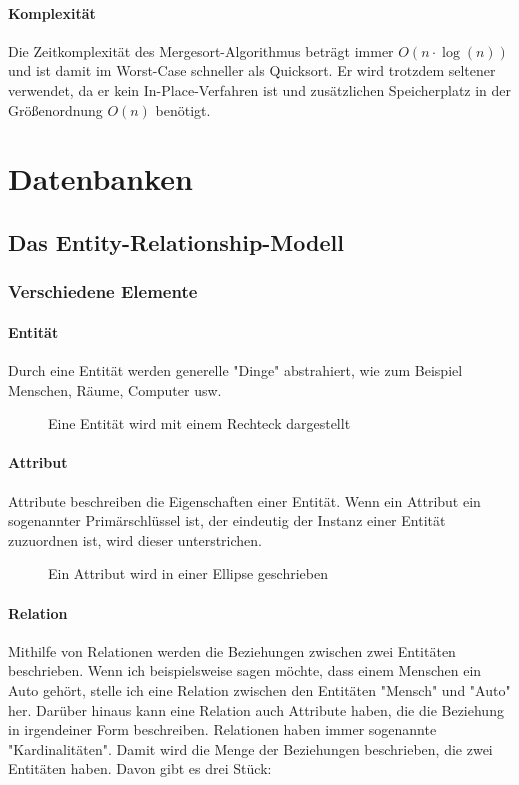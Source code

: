 \documentclass{article}
\begin{document}
	\paragraph{Komplexität}
	
	Die Zeitkomplexität des Mergesort-Algorithmus beträgt immer $O(n \cdot \log(n))$ und ist damit im Worst-Case schneller als Quicksort. Er wird trotzdem seltener verwendet, da er kein In-Place-Verfahren ist und zusätzlichen Speicherplatz in der Größenordnung $O(n)$ benötigt.

	\section{Datenbanken}
	\subsection{Das Entity-Relationship-Modell}
	\subsubsection{Verschiedene Elemente}
	\paragraph{Entität}
	Durch eine Entität werden generelle "Dinge" abstrahiert, wie zum Beispiel Menschen, Räume, Computer usw.

	\begin{figure}[h!]
		\centering
		
		\caption{Eine Entität wird mit einem Rechteck dargestellt}
	\end{figure}	

	\paragraph{Attribut}
	Attribute beschreiben die Eigenschaften einer Entität. Wenn ein Attribut ein sogenannter Primärschlüssel ist, der eindeutig der Instanz einer Entität zuzuordnen ist, wird dieser unterstrichen.

	\begin{figure}[h!]
		\centering
		
		\caption{Ein Attribut wird in einer Ellipse geschrieben}
	\end{figure}	

	\paragraph{Relation}
	Mithilfe von Relationen werden die Beziehungen zwischen zwei Entitäten beschrieben. Wenn ich beispielsweise sagen möchte, dass einem Menschen ein Auto gehört, stelle ich eine Relation zwischen den Entitäten "Mensch" und "Auto" her. Darüber hinaus kann eine Relation auch Attribute haben, die die Beziehung in irgendeiner Form beschreiben.
	Relationen haben immer sogenannte "Kardinalitäten". Damit wird die Menge der Beziehungen beschrieben, die zwei Entitäten haben. Davon gibt es drei Stück:
\end{document}
